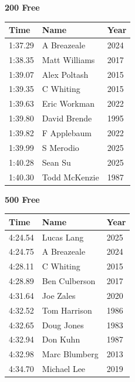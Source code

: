 \vspace{0.3em}
\vspace{1.2em}
\noindent\begin{minipage}[t]{0.48\textwidth}
\centering
\textbf{\textcolor{teamprimary}{200 Free}}\par
\vspace{0.5em}
\centering
\small
\renewcommand{\arraystretch}{1.0}
\setlength{\tabcolsep}{4pt}
\begin{tabular}{@{}p{1.8cm}p{3.0cm}p{1.0cm}@{}}
\toprule
\textbf{Time} & \textbf{Name} & \textbf{Year} \\
\midrule
1:37.29 & A Breazeale & 2024 \\
1:38.35 & Matt Williams & 2017 \\
1:39.07 & Alex Poltash & 2015 \\
1:39.35 & C Whiting & 2015 \\
1:39.63 & Eric Workman & 2022 \\
1:39.80 & David Brende & 1995 \\
1:39.82 & F Applebaum & 2022 \\
1:39.99 & S Merodio & 2025 \\
1:40.28 & Sean Su & 2025 \\
1:40.30 & Todd McKenzie & 1987 \\
\bottomrule
\end{tabular}
\end{minipage}
\hfill
\begin{minipage}[t]{0.48\textwidth}
\centering
\textbf{\textcolor{teamprimary}{500 Free}}\par
\vspace{0.5em}
\centering
\small
\renewcommand{\arraystretch}{1.0}
\setlength{\tabcolsep}{4pt}
\begin{tabular}{@{}p{1.8cm}p{3.0cm}p{1.0cm}@{}}
\toprule
\textbf{Time} & \textbf{Name} & \textbf{Year} \\
\midrule
4:24.54 & Lucas Lang & 2025 \\
4:24.75 & A Breazeale & 2024 \\
4:28.11 & C Whiting & 2015 \\
4:28.89 & Ben Culberson & 2017 \\
4:31.64 & Joe Zales & 2020 \\
4:32.52 & Tom Harrison & 1986 \\
4:32.65 & Doug Jones & 1983 \\
4:32.94 & Don Kuhn & 1987 \\
4:32.98 & Marc Blumberg & 2013 \\
4:34.70 & Michael Lee & 2019 \\
\bottomrule
\end{tabular}
\end{minipage}
